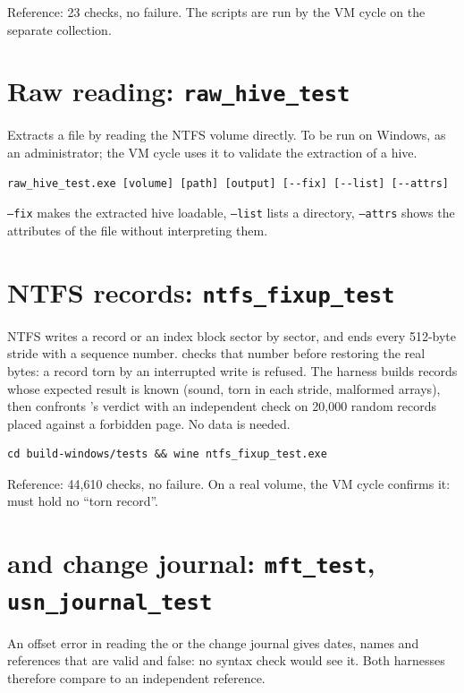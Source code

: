 \documentclass[11pt,a4paper,oneside]{report}
\begin{document}
Reference: 23 checks, no failure. The  scripts are run by the
VM cycle on the separate collection.

\section{Raw reading: \texttt{raw\_hive\_test}}

Extracts a file by reading the NTFS volume directly. To be run on Windows, as an
administrator; the VM cycle uses it to validate the extraction of a hive.

\begin{lstlisting}
raw_hive_test.exe [volume] [path] [output] [--fix] [--list] [--attrs]
\end{lstlisting}

\texttt{--fix} makes the extracted hive loadable, \texttt{--list} lists a
directory, \texttt{--attrs} shows the  attributes of the file
without interpreting them.

\section{NTFS records: \texttt{ntfs\_fixup\_test}}

NTFS writes a  record or an index block sector by sector,
and ends every 512-byte stride with a sequence number. \wac{} checks that
number before restoring the real bytes: a record torn by an interrupted write
is refused. The harness builds records whose expected result is known (sound,
torn in each stride, malformed arrays), then confronts \wac{}'s verdict with an
independent check on 20,000 random records placed against a forbidden page.
No data is needed.

\begin{lstlisting}
cd build-windows/tests && wine ntfs_fixup_test.exe
\end{lstlisting}

Reference: 44,610 checks, no failure. On a real volume, the VM cycle confirms
it:  must hold no ``torn record''.

\section{ and change journal: \texttt{mft\_test}, \texttt{usn\_journal\_test}}

An offset error in reading the  or the change journal gives
dates, names and references that are valid and false: no syntax check would
see it. Both harnesses therefore compare \wac{} to an independent reference.
\end{document}
